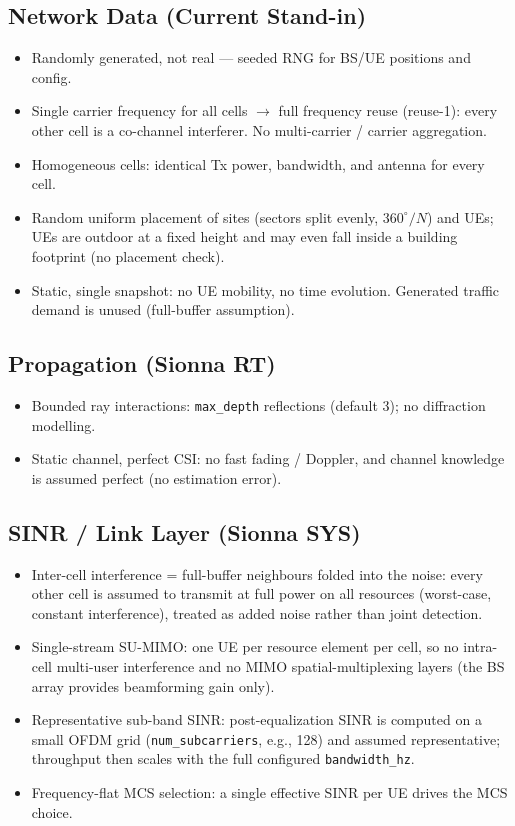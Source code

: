 \documentclass[11pt]{article}
\begin{document}
\subsection{Network Data (Current Stand-in)}
\begin{itemize}[leftmargin=*]
  \item Randomly generated, not real --- seeded RNG for BS/UE positions and config.
  \item Single carrier frequency for all cells $\rightarrow$ full frequency reuse
  (reuse-1): every other cell is a co-channel interferer. No multi-carrier / carrier
  aggregation.
  \item Homogeneous cells: identical Tx power, bandwidth, and antenna for every cell.
  \item Random uniform placement of sites (sectors split evenly, $360^\circ/N$) and
  UEs; UEs are outdoor at a fixed height and may even fall inside a building footprint
  (no placement check).
  \item Static, single snapshot: no UE mobility, no time evolution. Generated traffic
  demand is unused (full-buffer assumption).
\end{itemize}

\subsection{Propagation (Sionna RT)}
\begin{itemize}[leftmargin=*]
  \item Bounded ray interactions: \texttt{max_depth} reflections (default 3); no
  diffraction modelling.
  \item Static channel, perfect CSI: no fast fading / Doppler, and channel knowledge
  is assumed perfect (no estimation error).
\end{itemize}

\subsection{SINR / Link Layer (Sionna SYS)}
\begin{itemize}[leftmargin=*]
  \item Inter-cell interference = full-buffer neighbours folded into the noise: every
  other cell is assumed to transmit at full power on all resources (worst-case,
  constant interference), treated as added noise rather than joint detection.
  \item Single-stream SU-MIMO: one UE per resource element per cell, so no intra-cell
  multi-user interference and no MIMO spatial-multiplexing layers (the BS array
  provides beamforming gain only).
  \item Representative sub-band SINR: post-equalization SINR is computed on a small
  OFDM grid (\texttt{num_subcarriers}, e.g., 128) and assumed representative;
  throughput then scales with the full configured \texttt{bandwidth_hz}.
  \item Frequency-flat MCS selection: a single effective SINR per UE drives the MCS
  choice.
\end{itemize}
\end{document}
